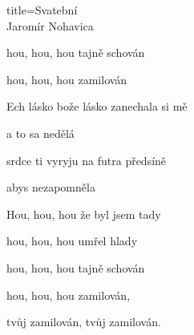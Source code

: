 \begin{song}{title=\predtitle\centering Svatební \\\large Jaromír Nohavica \vspace*{-0.3cm}}
\begin{centerjustified}
\begin{varwidth}[t]{0.48\textwidth}
hou, hou, hou tajně schován

hou, hou, hou zamilován


\sloka
Ech lásko bože lásko zanechala si mě

a to sa nedělá

srdce ti vyryju na futra předsíně

abys nezapomněla


Hou, hou, hou že byl jsem tady

hou, hou, hou umřel hlady

hou, hou, hou tajně schován

hou, hou, hou zamilován,

tvůj zamilován, tvůj zamilován.

\end{varwidth}

\end{centerjustified}
\setcounter{Slokočet}{0}
\end{song}
